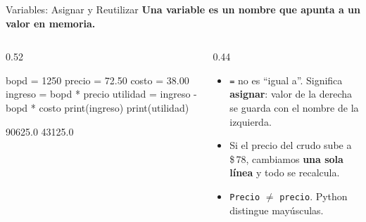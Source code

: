 \documentclass[aspectratio=169, 11pt]{beamer}
\begin{document}
\begin{frame}[fragile,shrink=10]{Variables: Asignar y Reutilizar}
  \vspace{-6pt}
  {\small\color{arcaDark}\bfseries
    Una variable es un nombre que apunta a un valor en memoria.}

  \vspace{3pt}
  \begin{columns}[T]
    \begin{column}{0.52\textwidth}
      \begin{pyblock}
bopd = 1250
precio = 72.50
costo = 38.00
ingreso = bopd * precio
utilidad = ingreso - bopd * costo
print(ingreso)
print(utilidad)
      \end{pyblock}
      \vspace{-2pt}
      \begin{outputblock}
90625.0
43125.0
      \end{outputblock}
    \end{column}

    \begin{column}{0.44\textwidth}
      {\scriptsize\color{textMuted}
      \begin{itemize}\setlength{\itemsep}{3pt}
        \item[{\color{arcaRed}\scriptsize\faArrowRight}]
          \texttt{=} no es ``igual a''.
          Significa \textbf{asignar}: valor de la
          derecha se guarda con el nombre de la izquierda.
        \item[{\color{arcaRed}\scriptsize\faArrowRight}]
          Si el precio del crudo sube a \$\,78, cambiamos
          \textbf{una sola línea} y todo se recalcula.
        \item[{\color{arcaRed}\scriptsize\faExclamationTriangle}]
          \texttt{Precio} $\neq$ \texttt{precio}.
          Python distingue mayúsculas.
      \end{itemize}
      }
    \end{column}
  \end{columns}
\end{frame}
\end{document}
